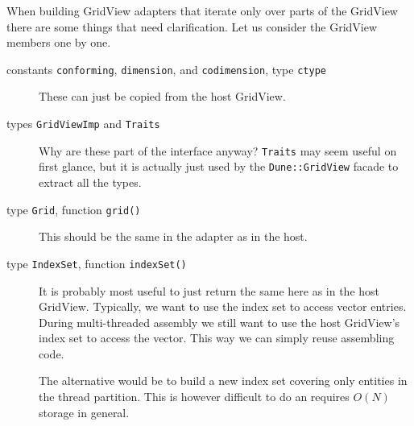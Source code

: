 \documentclass{article}
\begin{document}
When building GridView adapters that iterate only over parts of the GridView
there are some things that need clarification.  Let us consider the GridView
members one by one.
\begin{description}
\item[constants {\tt conforming}, {\tt dimension}, and {\tt codimension}, type
  {\tt ctype}] These can just be copied from the host GridView.
\item[types {\tt GridViewImp} and {\tt Traits}] Why are these part of the
  interface anyway?  {\tt Traits} may seem useful on first glance, but it is
  actually just used by the {\tt Dune::GridView} facade to extract all the
  types.
\item[type {\tt Grid}, function \tt grid()] This should be the same in the
  adapter as in the host.
\item[type {\tt IndexSet}, function \tt indexSet()] It is probably most useful
  to just return the same here as in the host GridView.  Typically, we want to
  use the index set to access vector entries.  During multi-threaded assembly
  we still want to use the host GridView's index set to access the vector.
  This way we can simply reuse assembling code.

  The alternative would be to build a new index set covering only entities in
  the thread partition.  This is however difficult to do an requires $O(N)$
  storage in general.


\end{description}
\end{document}
